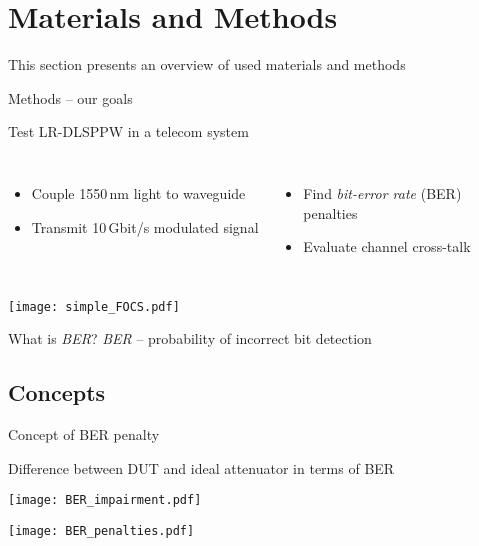\section{Materials and Methods}
  This section presents an overview of used materials and methods
  \begin{frame}{Methods -- our goals}
    \begin{block}{Test LR-DLSPPW in a telecom system}
    \begin{columns}
        \begin{itemize}
          \item Couple 1550\,nm light to waveguide
          \item Transmit 10\,Gbit/s modulated signal
        \end{itemize}
        \begin{itemize}
          \item Find \emph{bit-error rate} (BER)\\
                \hfill penalties~~~
          \item Evaluate channel cross-talk
        \end{itemize}
    \end{columns}
    \vspace{2mm}
        \begin{center}
          \texttt{[image: simple\_FOCS.pdf]}
        \end{center}
    \end{block}
      \begin{exampleblock}{What is \emph{BER}?}
        \emph{BER} -- probability of incorrect bit detection\\
      \end{exampleblock}

  \end{frame}

  
 
  \subsection{Concepts} %
  \label{sub:concepts}
  \begin{frame}{Concept of BER penalty}
    \begin{block}{Difference between DUT and ideal attenuator in terms of BER}
      \begin{center}
        \texttt{[image: BER\_impairment.pdf]}
      \end{center}
    \end{block}
    \begin{center}
      \texttt{[image: BER\_penalties.pdf]}
    \end{center}
  \end{frame}



